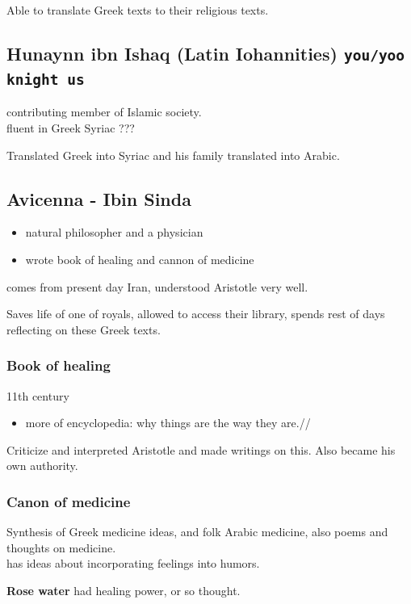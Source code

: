 \documentclass[11pt]{article}
\begin{document}
Able to translate Greek texts to their religious texts.

\subsection{Hunaynn ibn Ishaq (Latin Iohannities) \texttt{you/yoo knight us}}
\label{sec-8-11}
contributing member of Islamic society.\\
fluent in Greek Syriac ???

Translated Greek into Syriac and his family translated into Arabic.

\subsection{Avicenna - Ibin Sinda}
\label{sec-8-12}
\begin{itemize}
\item natural philosopher and a physician\\
\item wrote book of healing and cannon of medicine
\end{itemize}

comes from present day Iran, understood Aristotle very well.

Saves life of one of royals, allowed to access their library, spends rest of days reflecting on these Greek texts.

\subsubsection{Book of healing}
\label{sec-8-12-1}
11th century
\begin{itemize}
\item more of encyclopedia: why things are the way they are.//
\end{itemize}

Criticize and interpreted Aristotle and made writings on this. Also became his own authority.

\subsubsection{Canon of medicine}
\label{sec-8-12-2}
Synthesis of Greek medicine ideas, and folk Arabic medicine, also poems and thoughts on medicine.\\
has ideas about incorporating feelings into humors.

\textbf{Rose water} had healing power, or so thought.
\end{document}
